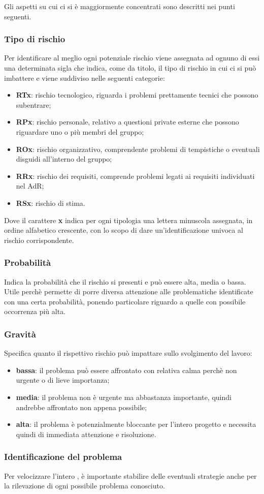 Gli aspetti su cui ci si è maggiormente concentrati sono descritti nei punti seguenti.

\subsubsection{Tipo di rischio}
    Per identificare al meglio ogni potenziale rischio viene assegnata ad ognuno di essi una determinata sigla che indica, come da titolo, il tipo di rischio in cui ci si può imbattere e viene suddiviso nelle seguenti categorie:
    \begin{itemize}
        \item \textbf{RTx}: rischio tecnologico, riguarda i problemi prettamente tecnici che possono subentrare;
        \item \textbf{RPx}: rischio personale, relativo a questioni private esterne che possono riguardare uno o più membri del gruppo;
        \item \textbf{ROx}: rischio organizzativo, comprendente problemi di tempistiche o eventuali disguidi all'interno del gruppo;
        \item \textbf{RRx}: rischio dei requisiti, comprende problemi legati ai requisiti individuati nel AdR;
        \item \textbf{RSx}: rischio di stima.
    \end{itemize}
    Dove il carattere \textbf{x} indica per ogni tipologia una lettera minuscola assegnata, in ordine alfabetico crescente, con lo scopo di dare un'identificazione univoca al rischio corrispondente.
    
\subsubsection{Probabilità}
    Indica la probabilità che il rischio si presenti e può essere alta, media o bassa. Utile perchè permette di porre diversa attenzione alle problematiche identificate con una certa probabilità, ponendo particolare riguardo a quelle con possibile occorrenza più alta.

\subsubsection{Gravità}
    Specifica quanto il rispettivo rischio può impattare sullo svolgimento del lavoro:
    \begin{itemize}
        \item \textbf{bassa}: il problema può essere affrontato con relativa calma perchè non urgente o di lieve importanza;
        \item \textbf{media}: il problema non è urgente ma abbastanza importante, quindi andrebbe affrontato non appena possibile;
        \item \textbf{alta}: il problema è potenzialmente bloccante per l'intero progetto e necessita quindi di immediata attenzione e risoluzione.
    \end{itemize}
    
\subsubsection{Identificazione del problema}
    Per velocizzare l'intero , è importante stabilire delle eventuali strategie anche per la rilevazione di ogni possibile problema conosciuto.
